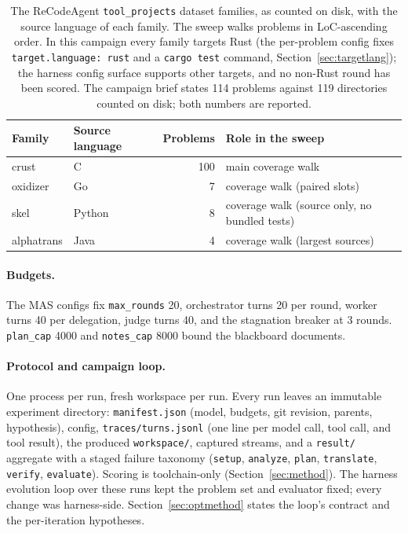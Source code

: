 \documentclass[11pt]{article}
\begin{document}
\begin{table}[ht]
\centering
\begin{tabular}{llrl}
\toprule
Family & Source language & Problems & Role in the sweep \\
\midrule
crust & C & 100 & main coverage walk \\
oxidizer & Go & 7 & coverage walk (paired slots) \\
skel & Python & 8 & coverage walk (source only, no bundled tests) \\
alphatrans & Java & 4 & coverage walk (largest sources) \\
\bottomrule
\end{tabular}
\caption{The ReCodeAgent \texttt{tool\_projects} dataset families, as
counted on disk, with the source language of each family. The sweep
walks problems in LoC-ascending order. In this campaign every family
targets Rust (the per-problem config fixes \texttt{target.language:
  rust} and a \texttt{cargo test} command,
Section~\ref{sec:targetlang}); the harness config surface supports other
targets, and no non-Rust round has been scored. The campaign
brief states 114 problems against 119 directories counted on disk; both
numbers are reported.}
\label{tab:problems}
\end{table}

\paragraph{Budgets.}
The MAS configs fix \texttt{max\_rounds} 20, orchestrator turns 20 per
round, worker turns 40 per delegation, judge turns 40, and the stagnation
breaker at 3 rounds. \texttt{plan\_cap} 4000 and \texttt{notes\_cap} 8000
bound the blackboard documents.

\paragraph{Protocol and campaign loop.}
One process per run, fresh workspace per run. Every run
leaves an immutable experiment directory: \texttt{manifest.json} (model,
budgets, git revision, parents, hypothesis), config,
\texttt{traces/turns.jsonl} (one line per model call, tool call, and tool
result), the produced \texttt{workspace/}, captured streams, and a
\texttt{result/} aggregate with a staged failure taxonomy
(\texttt{setup}, \texttt{analyze}, \texttt{plan}, \texttt{translate},
\texttt{verify}, \texttt{evaluate}). Scoring is toolchain-only
(Section~\ref{sec:method}). The harness evolution loop over these runs kept
the problem set and evaluator fixed; every change
was harness-side. Section~\ref{sec:optmethod} states the loop's
contract and the per-iteration hypotheses.
\end{document}
